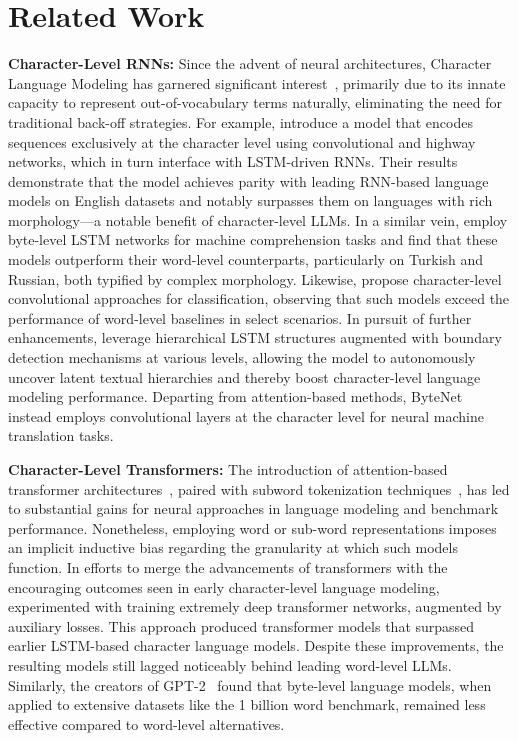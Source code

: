 \section{Related Work}
\label{section:related_work}

\textbf{Character-Level RNNs:} Since the advent of neural architectures, Character Language Modeling has garnered significant interest~\citep{sutskever2011generating,mikolov2012subword,graves2013generating}, primarily due to its innate capacity to represent out-of-vocabulary terms naturally, eliminating the need for traditional back-off strategies. For example, \cite{kim2016character} introduce a model that encodes sequences exclusively at the character level using convolutional and highway networks, which in turn interface with LSTM-driven RNNs. Their results demonstrate that the model achieves parity with leading RNN-based language models on English datasets and notably surpasses them on languages with rich morphology—a notable benefit of character-level LLMs. In a similar vein, \cite{kenter2018byte} employ byte-level LSTM networks for machine comprehension tasks and find that these models outperform their word-level counterparts, particularly on Turkish and Russian, both typified by complex morphology. Likewise, \cite{zhang2015character} propose character-level convolutional approaches for classification, observing that such models exceed the performance of word-level baselines in select scenarios. In pursuit of further enhancements, \citet{chung2019hierarchical} leverage hierarchical LSTM structures augmented with boundary detection mechanisms at various levels, allowing the model to autonomously uncover latent textual hierarchies and thereby boost character-level language modeling performance. Departing from attention-based methods, ByteNet~\cite{kalchbrenner2016neural} instead employs convolutional layers at the character level for neural machine translation tasks.

\textbf{Character-Level Transformers:} The introduction of attention-based transformer architectures~\citep{vaswani2017attention}, paired with subword tokenization techniques~\citep{sennrich-etal-2016-neural}, has led to substantial gains for neural approaches in language modeling and benchmark performance. Nonetheless, employing word or sub-word representations imposes an implicit inductive bias regarding the granularity at which such models function. In efforts to merge the advancements of transformers with the encouraging outcomes seen in early character-level language modeling, \citet{al2019character} experimented with training extremely deep transformer networks, augmented by auxiliary losses. This approach produced transformer models that surpassed earlier LSTM-based character language models. Despite these improvements, the resulting models still lagged noticeably behind leading word-level LLMs. Similarly, the creators of GPT-2~\citep{radfordgpt2} found that byte-level language models, when applied to extensive datasets like the 1 billion word benchmark, remained less effective compared to word-level alternatives.

